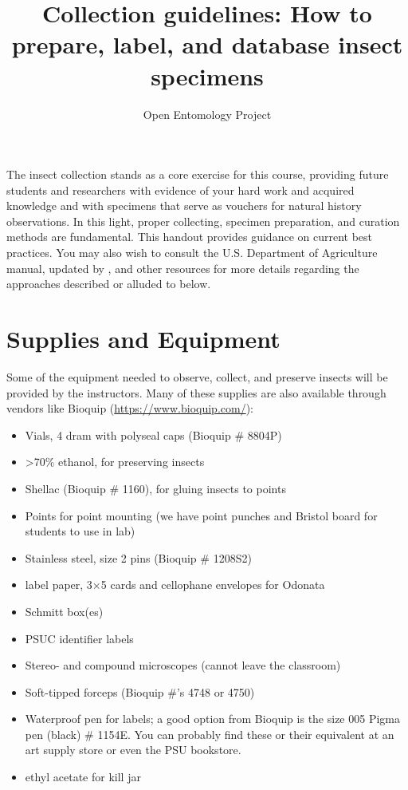 \documentclass[letterpaper, 11pt]{article}
\title{Collection guidelines: How to prepare, label, and database insect specimens}
\author{Open Entomology Project}
\begin{document}
\cleanlookdateon %
\maketitle
\thispagestyle{fancy}

The insect collection stands as a core exercise for this course, providing future students and researchers with evidence of your hard work and acquired knowledge and with specimens that serve as vouchers for natural history observations. In this light, proper collecting, specimen preparation, and curation methods are fundamental. This handout provides guidance on current best practices. You may also wish to consult the U.S. Department of Agriculture manual, updated by \cite{USDAmanual}, and other resources for more details regarding the approaches described or alluded to below. 

\section*{Supplies and Equipment}
Some of the equipment needed to observe, collect, and preserve insects will be provided by the instructors. Many of these supplies are also available through vendors like Bioquip (\url{https://www.bioquip.com/}):

\begin{itemize}
\item Vials, 4 dram with polyseal caps (Bioquip \# 8804P)
\item \textgreater70\% ethanol, for preserving insects
\item Shellac (Bioquip \# 1160), for gluing insects to points
\item Points for point mounting (we have point punches and Bristol board for students to use in lab)
\item Stainless steel, size 2 pins (Bioquip \# 1208S2)
\item label paper, 3$\times$5 cards and cellophane envelopes for Odonata
\item Schmitt box(es)
\item PSUC identifier labels
\item Stereo- and compound microscopes (cannot leave the classroom)
\item Soft-tipped forceps (Bioquip \#'s 4748 or 4750)
\item Waterproof pen for labels; a good option from Bioquip is the size 005 Pigma pen (black) \# 1154E. You can probably find these or their equivalent at an art supply store or even the PSU bookstore.
\item ethyl acetate for kill jar
\end{itemize}
\end{document}
